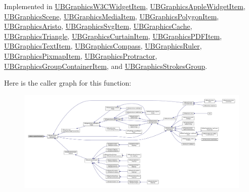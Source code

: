 Implemented in \hyperlink{class_u_b_graphics_w3_c_widget_item_ac66c8274e94b6818db04a60e712ac97c}{U\-B\-Graphics\-W3\-C\-Widget\-Item}, \hyperlink{class_u_b_graphics_apple_widget_item_acf4a19fa67c6752e18087e82ad64e973}{U\-B\-Graphics\-Apple\-Widget\-Item}, \hyperlink{class_u_b_graphics_scene_a6b3b2507342f09b1169b7b1ef1427118}{U\-B\-Graphics\-Scene}, \hyperlink{class_u_b_graphics_media_item_a1fea58ac7234a2090777c67d2a88e5f4}{U\-B\-Graphics\-Media\-Item}, \hyperlink{class_u_b_graphics_polygon_item_a4fc95b8ef165429d9f86ffe128e4839a}{U\-B\-Graphics\-Polygon\-Item}, \hyperlink{class_u_b_graphics_aristo_af67823d02c787d0f52b8955454a2bfa8}{U\-B\-Graphics\-Aristo}, \hyperlink{class_u_b_graphics_svg_item_a467ce14bcf2b4c27a01ab128c6149b1c}{U\-B\-Graphics\-Svg\-Item}, \hyperlink{class_u_b_graphics_cache_a1ed78b934144d8cceaa274f6ff2c82cf}{U\-B\-Graphics\-Cache}, \hyperlink{class_u_b_graphics_triangle_ad90ae6a2a2237bb2f119d89c93be0c94}{U\-B\-Graphics\-Triangle}, \hyperlink{class_u_b_graphics_curtain_item_a8378742b3277026ab68263bedb11c407}{U\-B\-Graphics\-Curtain\-Item}, \hyperlink{class_u_b_graphics_p_d_f_item_ab3d90209627f4a32b21fbdb527bd4468}{U\-B\-Graphics\-P\-D\-F\-Item}, \hyperlink{class_u_b_graphics_text_item_a14c3b9ff16071a306fe0834577aa26fa}{U\-B\-Graphics\-Text\-Item}, \hyperlink{class_u_b_graphics_compass_a6ddc850411604453d18acdfd26e4020f}{U\-B\-Graphics\-Compass}, \hyperlink{class_u_b_graphics_ruler_adb8e2e0d97de3099a4c66d21674cab02}{U\-B\-Graphics\-Ruler}, \hyperlink{class_u_b_graphics_pixmap_item_a800d04419404cec2d43f4feccb1673e6}{U\-B\-Graphics\-Pixmap\-Item}, \hyperlink{class_u_b_graphics_protractor_a4ac849a2b7e1dd840b694082e20fd6ed}{U\-B\-Graphics\-Protractor}, \hyperlink{class_u_b_graphics_group_container_item_a70f918cf5ac238dc33232946fa893f9a}{U\-B\-Graphics\-Group\-Container\-Item}, and \hyperlink{class_u_b_graphics_strokes_group_ab34ce07e062a2f2bd454dc2309b88396}{U\-B\-Graphics\-Strokes\-Group}.



Here is the caller graph for this function\-:
\nopagebreak
\begin{figure}[H]
\begin{center}
\leavevmode
\includegraphics[width=350pt]{d8/d1e/class_u_b_item_a21483eccaad22369e9fe6bca838af029_icgraph}
\end{center}
\end{figure}


